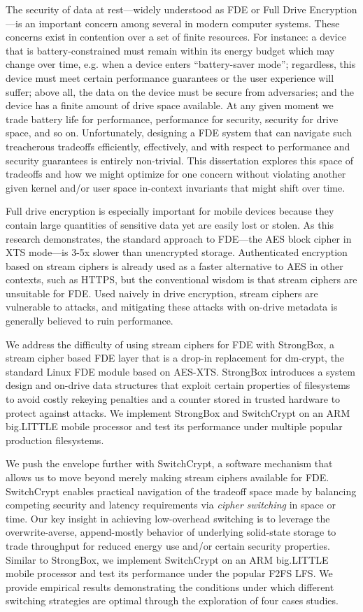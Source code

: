 \abstract
The security of data at rest---widely understood as FDE or Full Drive
Encryption---is an important concern among several in modern computer systems.
These concerns exist in contention over a set of finite resources. For instance:
a device that is battery-constrained must remain within its energy budget which
may change over time, e.g. when a device enters ``battery-saver mode'';
regardless, this device must meet certain performance guarantees or the user
experience will suffer; above all, the data on the device must be secure from
adversaries; and the device has a finite amount of drive space available. At any
given moment we trade battery life for performance, performance for security,
security for drive space, and so on. Unfortunately, designing a FDE system that
can navigate such treacherous tradeoffs efficiently, effectively, and with
respect to performance and security guarantees is entirely non-trivial. This
dissertation explores this space of tradeoffs and how we might optimize for one
concern without violating another given kernel and/or user space in-context
invariants that might shift over time.

Full drive encryption is especially important for mobile devices because they
contain large quantities of sensitive data yet are easily lost or stolen. As
this research demonstrates, the standard approach to FDE—the AES block cipher in
XTS mode—is 3-5x slower than unencrypted storage. Authenticated encryption based
on stream ciphers is already used as a faster alternative to AES in other
contexts, such as HTTPS, but the conventional wisdom is that stream ciphers are
unsuitable for FDE. Used naively in drive encryption, stream ciphers are
vulnerable to attacks, and mitigating these attacks with on-drive metadata is
generally believed to ruin performance.

We address the difficulty of using stream ciphers for FDE with StrongBox, a
stream cipher based FDE layer that is a drop-in replacement for dm-crypt, the
standard Linux FDE module based on AES-XTS. StrongBox introduces a system design
and on-drive data structures that exploit certain properties of filesystems to
avoid costly rekeying penalties and a counter stored in trusted hardware to
protect against attacks. We implement StrongBox and SwitchCrypt on an ARM
big.LITTLE mobile processor and test its performance under multiple popular
production filesystems.

We push the envelope further with SwitchCrypt, a software mechanism that allows
us to move beyond merely making stream ciphers available for FDE. SwitchCrypt
enables practical navigation of the tradeoff space made by balancing competing
security and latency requirements via \emph{cipher switching} in space or time.
Our key insight in achieving low-overhead switching is to leverage the
overwrite-averse, append-mostly behavior of underlying solid-state storage to
trade throughput for reduced energy use and/or certain security properties.
Similar to StrongBox, we implement SwitchCrypt on an ARM big.LITTLE mobile
processor and test its performance under the popular F2FS LFS. We provide
empirical results demonstrating the conditions under which different switching
strategies are optimal through the exploration of four cases studies.

